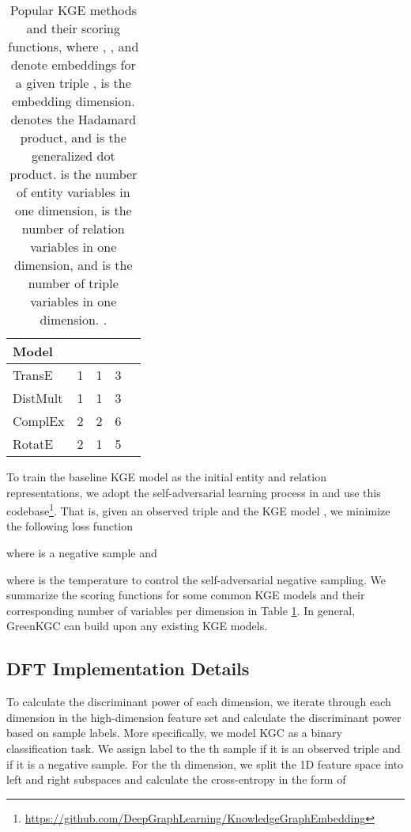 \documentclass{article}
\begin{document}
\begin{table}[ht]
\setlength\tabcolsep{3pt}
\centering
\begin{tabular}{ l  c  c  c  c }
\toprule
Model &  &  &  & \\
\midrule
TransE   & 1 & 1 & 3 &  \\
DistMult & 1 & 1 & 3 &  \\
ComplEx  & 2 & 2 & 6 &  \\
RotatE   & 2 & 1 & 5 &  \\
\bottomrule
\end{tabular}
\caption{Popular KGE methods and their scoring functions, where , , 
and  denote embeddings for a given triple ,  is the
embedding dimension.  denotes the Hadamard product, and
 is the generalized dot product.  
is the number of entity variables in one dimension,  
is the number of relation variables in one dimension, and  
is the number of triple variables in one dimension. .}
\label{tab:models}
\end{table}


To train the baseline KGE model as the initial entity and relation
representations, we adopt the self-adversarial learning process in
\citet{sun2018rotate} and use this 
codebase\footnote{\url{https://github.com/DeepGraphLearning/KnowledgeGraphEmbedding}}. 
That is, given an observed triple  and
the KGE model , we minimize the following loss function

where  is a negative sample and 

where  is the temperature to control the self-adversarial 
negative sampling. We summarize the scoring functions for 
some common KGE models and their corresponding number of variables per
dimension in Table \ref{tab:models}. In general, 
GreenKGC can build upon any existing KGE models.


\subsection{DFT Implementation Details}\label{appendix:dft}

To calculate the discriminant power of each dimension, we iterate
through each dimension in the high-dimension feature set and calculate
the discriminant power based on sample labels. More specifically,
we model KGC as a binary classification task. We assign label 
to the th sample if it is an observed triple and  if it
is a negative sample. For the th dimension, we split the 1D
feature space into left and right subspaces and calculate the cross-entropy
in the form of
\end{document}
